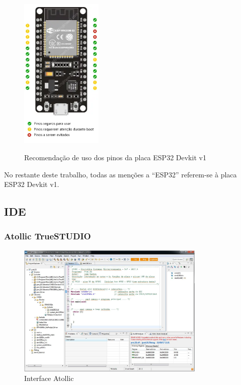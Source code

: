 \begin{figure}[ht]
	\centering
	\caption{Recomendação de uso dos pinos da placa ESP32 Devkit v1}
	\includegraphics[width=0.35\textwidth]{figures/esp32_pinout_ref}
	\label{esp32_pinout_ref}
\end{figure}

No restante deste trabalho, todas as menções a ``ESP32'' referem-se à placa
ESP32 Devkit v1.


\subsection{IDE}

\subsubsection{Atollic TrueSTUDIO}

\begin{figure}[ht]
	\centering
	\caption{Interface Atollic}
	\includegraphics[width=0.8\textwidth]{figures/atollic}
\end{figure}

